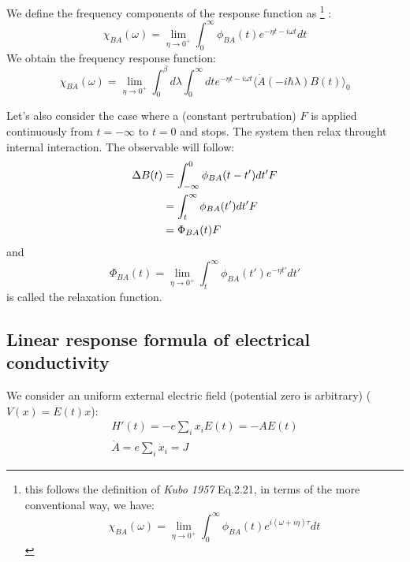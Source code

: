 \documentclass{article}
\begin{document}
We define the frequency components of the response function as
\footnote{this follows the definition of \emph{Kubo 1957} Eq.2.21, in terms
of the more conventional way, we have:
\begin{equation}
    \chi_{BA}(\omega) = \lim_{\eta\to 0^+} \int_{0}^{\infty} \phi_{BA} (t) e^{i(\omega+i\eta)\tau} dt
\end{equation}
}
:
\begin{equation}
    \chi_{BA}(\omega) = \lim_{\eta\to 0^+} \int_{0}^{\infty} \phi_{BA} (t) e^{-\eta t-i\omega t} dt
\end{equation}
We obtain the frequency response function:
\begin{equation}
    \chi_{BA}(\omega) = 
    \lim_{\eta\to 0^+} \int_0^{\beta} d\lambda \int_{0}^{\infty} dt e^{-\eta t-i\omega t} \langle \dot{A}(-i\hbar\lambda) B(t) \rangle_0 
\end{equation}

Let's also consider the case where a (constant pertrubation) $F$ is applied continuously from $t = -\infty$ to 
$t = 0$ and stops. The system then relax throught internal interaction. The observable will
follow:
\begin{align}
    \Delta B(t) &= \int_{-\infty}^{0} \phi_{BA} (t-t') dt' F \notag \\
                &= \int_{t}^{\infty} \phi_{BA} (t') dt' F \notag \\
                &= \Phi_{BA} (t) F
\end{align}
and
\begin{equation}
    \Phi_{BA} (t) = \lim_{\eta\to 0^+} \int_{t}^{\infty} \phi_{BA} (t') e^{-\eta t'} dt'
\end{equation}
is called the relaxation function.

\subsection{Linear response formula of electrical conductivity}
We consider an uniform external electric field (potential zero is arbitrary) ($V(x) = E(t)x $):
\begin{gather}
    H'(t) = -e \sum_i x_i E(t) = - A E(t) \\
    \dot{A} = e \sum_i \dot{x}_i = J
\end{gather}
\end{document}
